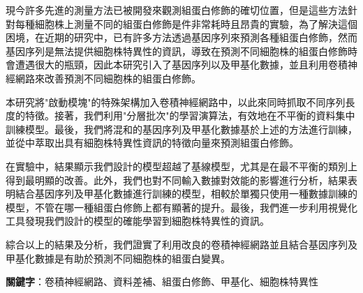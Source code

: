 現今許多先進的測量方法已被開發來觀測組蛋白修飾的確切位置，但是這些方法針對每種細胞株上測量不同的組蛋白修飾是件非常耗時且昂貴的實驗，為了解決這個困境，在近期的研究中，已有許多方法透過基因序列來預測各種組蛋白修飾，然而基因序列是無法提供細胞株特異性的資訊，導致在預測不同細胞株的組蛋白修飾時會遭遇很大的瓶頸，因此本研究引入了基因序列以及甲基化數據，並且利用卷積神經網路來改善預測不同細胞株的組蛋白修飾。

本研究將"啟動模塊"的特殊架構加入卷積神經網路中，以此來同時抓取不同序列長度的特徵。接著，我們利用"分層批次"的學習演算法，有效地在不平衡的資料集中訓練模型。最後，我們將混和的基因序列及甲基化數據基於上述的方法進行訓練，並從中萃取出具有細胞株特異性資訊的特徵向量來預測組蛋白修飾。

在實驗中，結果顯示我們設計的模型超越了基線模型，尤其是在最不平衡的類別上得到最明顯的改善。此外，我們也對不同輸入數據對效能的影響進行分析，結果表明結合基因序列及甲基化數據進行訓練的模型，相較於單獨只使用一種數據訓練的模型，不管在哪一種組蛋白修飾上都有顯著的提升。最後，我們進一步利用視覺化工具發現我們設計的模型的確能學習到細胞株特異性的資訊。

綜合以上的結果及分析，我們證實了利用改良的卷積神經網路並且結合基因序列及甲基化數據是有助於預測不同細胞株的組蛋白變異。








\begin{flushleft}
\mbox{{\bf 關鍵字}：卷積神經網路、資料差補、組蛋白修飾、甲基化、細胞株特異性}
\end{flushleft}
